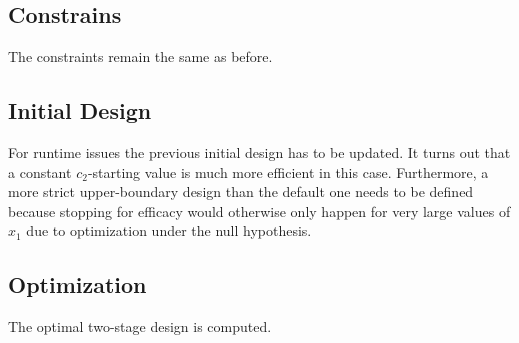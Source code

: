 \documentclass[]{book}
\newenvironment{Shaded}{\begin{snugshade}}{\end{snugshade}}
\newcommand{\DecValTok}[1]{\textcolor[rgb]{0.00,0.00,0.81}{#1}}
\newcommand{\FloatTok}[1]{\textcolor[rgb]{0.00,0.00,0.81}{#1}}
\newcommand{\KeywordTok}[1]{\textcolor[rgb]{0.13,0.29,0.53}{\textbf{#1}}}
\newcommand{\NormalTok}[1]{#1}
\newcommand{\OperatorTok}[1]{\textcolor[rgb]{0.81,0.36,0.00}{\textbf{#1}}}
\newcommand{\StringTok}[1]{\textcolor[rgb]{0.31,0.60,0.02}{#1}}
\begin{document}
\hypertarget{constrains-1}{%
\subsection{Constrains}\label{constrains-1}}

The constraints remain the same as before.

\hypertarget{initial-design-1}{%
\subsection{Initial Design}\label{initial-design-1}}

For runtime issues the previous initial design has to be updated.
It turns out that a constant \(c_2\)-starting value is much more efficient
in this case.
Furthermore, a more strict upper-boundary design than the default one needs
to be defined because stopping for efficacy would otherwise only happen
for very large values of \(x_1\) due to optimization under the null hypothesis.

\begin{Shaded}
\end{Shaded}

\hypertarget{optimization-1}{%
\subsection{Optimization}\label{optimization-1}}

The optimal two-stage design is computed.
\end{document}
